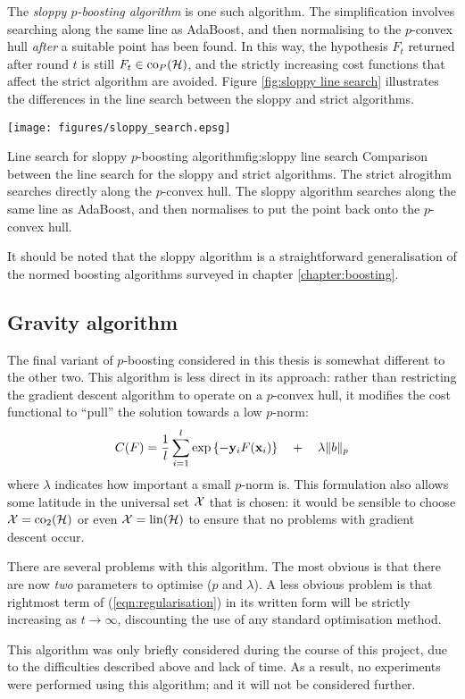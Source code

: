 The \emph{sloppy $p$-boosting algorithm} is one such algorithm.  The
simplification involves searching along the same line as AdaBoost, and
then normalising to the $p$-convex hull \emph{after} a suitable point
has been found.  In this way, the hypothesis $F_t$ returned after
round $t$ is still $F_t \in \mathrm{co}_P(\mathcal{H})$, and the strictly increasing
cost functions that affect the strict algorithm are avoided.  Figure
\ref{fig:sloppy line search} illustrates the differences in the line
search between the sloppy and strict algorithms.

\begin{linefigure}
\begin{center}
\texttt{[image: figures/sloppy\_search.epsg]}
\end{center}
\begin{capt}{Line search for sloppy $p$-boosting algorithm}{fig:sloppy line search}
Comparison between the line search for the sloppy and strict
algorithms.  The strict alrogithm searches directly along the
$p$-convex hull.  The sloppy algorithm searches along the same line as
AdaBoost, and then normalises to put the point back onto the
$p$-convex hull.
\end{capt}
\end{linefigure}

It should be noted that the sloppy algorithm is a straightforward
generalisation of the normed boosting algorithms surveyed in chapter
\ref{chapter:boosting}.


\subsection{Gravity algorithm}

The final variant of $p$-boosting considered in this thesis is
somewhat different to the other two.  This algorithm is less direct in
its approach: rather than restricting the gradient descent algorithm
to operate on a $p$-convex hull, it modifies the cost functional to
``pull'' the solution towards a low $p$-norm:
%
\begin{equation}
C(F) = \frac{1}{l} \sum_{i=1}^{l} \exp
\left\{ -\mathbf{y}_iF(\mathbf{x}_i) \right\} \quad + \quad \lambda \|b\|_p
\label{eqn:regularisation}
\end{equation}
%
where $\lambda$ indicates how important a small $p$-norm is.  This
formulation also allows some latitude in the universal set $\mathcal{X}$
that is chosen: it would be sensible to choose $\mathcal{X} = \mathrm{co}_2(\mathcal{H})$
or even $\mathcal{X} = \mathrm{lin}(\mathcal{H})$ to ensure that no problems with gradient
descent occur.

There are several problems with this algorithm.  The most obvious is that
there are now \emph{two} parameters to optimise ($p$ and $\lambda$).
A less obvious problem is that rightmost term of
(\ref{eqn:regularisation}) in its written form will be strictly
increasing as $t \rightarrow \infty$, discounting the use of any
standard optimisation method.

This algorithm was only briefly considered during the course of this
project, due to the difficulties described above and lack of time.  As
a result, no experiments were performed using this algorithm; and it
will not be considered further.




